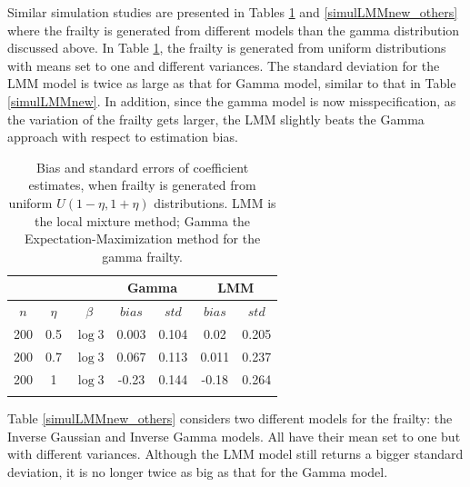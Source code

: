 \documentclass[graybox]{svmult}
\begin{document}
Similar simulation studies are presented in Tables \ref{simulLMMnew_unif} and \ref{simulLMMnew_others} where the frailty is generated from different models than the gamma distribution discussed above. In Table \ref{simulLMMnew_unif}, the frailty is generated from uniform distributions with  means set to one and different variances. The standard deviation for the LMM model is twice as large as that for Gamma model, similar to that in Table \ref{simulLMMnew}. 
In addition, since the  gamma model is now misspecification, as the variation of the frailty gets larger, the LMM slightly beats  the Gamma approach with respect to estimation bias.   

 
\begin{table}[h!]
\caption{Bias and standard errors of coefficient estimates, when frailty 
is generated from uniform $U(1-\eta , 1+\eta)$ distributions. LMM is the local mixture method; Gamma the 
Expectation-Maximization method for the gamma frailty.}
\label{simulLMMnew_unif}
\begin{center}
\begin{tabular}{c c c c c c c}

\hline  
& & &\multicolumn{2}{c}{Gamma } & \multicolumn{2}{c}{LMM}\\ [0.3ex]
\hline
$n$ & $\eta$ & $\beta$ &  $bias$ & $std$ & $bias$ & $std$ \\ [0.3ex] 
\hline 
200 & 0.5&  $\log{3}$ &  0.003 &  0.104 & 0.02 &0.205\\ 
200 & 0.7&  $\log{3}$ & 0.067 & 0.113  & 0.011  & 0.237\\ 
200 & 1&  $\log{3}$ & -0.23& 0.144 & -0.18  &0.264 \\ 
\hline\\

\end{tabular}
\end{center}
\end{table}

Table \ref{simulLMMnew_others} considers two different models for the frailty: the Inverse Gaussian and Inverse Gamma models. All have their  mean set to one but with different variances. Although the LMM model still returns a bigger standard deviation, it is no longer  twice as big as that for the Gamma model.   
\end{document}
